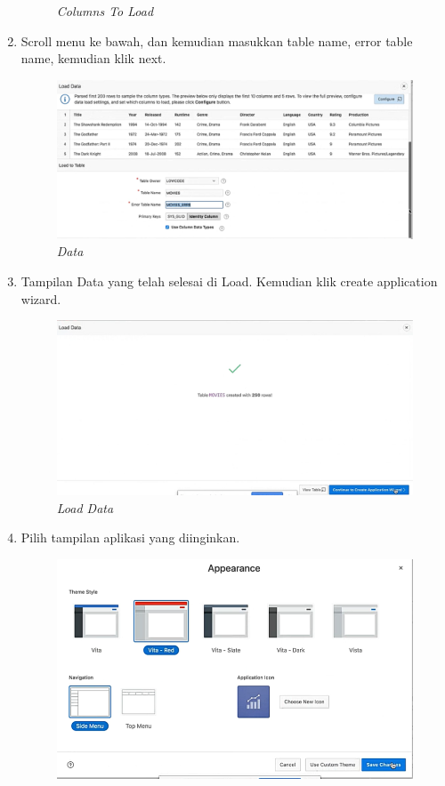 \begin{enumerate}
\begin{figure}[H]
    \caption{\textit{Columns To Load}}
    \label{Colums}
\end{figure}
 \item Scroll menu ke bawah, dan kemudian masukkan table name, error table name, kemudian klik next.
 \begin{figure}[H]
    \centering
    \includegraphics[scale=0.5]{figures/13}
    \caption{\textit{Data}}
    \label{Table}
\end{figure}
 \item Tampilan Data yang telah selesai di Load. Kemudian klik create application wizard.
 \begin{figure}[H]
    \centering
    \includegraphics[scale=0.5]{figures/14}
    \caption{\textit{Load Data}}
    \label{Load Complete}
\end{figure}
 \item Pilih tampilan aplikasi yang diinginkan.
 \begin{figure}[H]
    \centering
    \includegraphics[scale=0.5]{figures/15}

\end{figure}
\end{enumerate}
